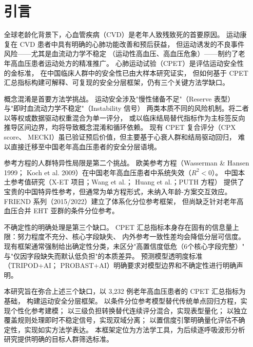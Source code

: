 \documentclass[12pt, a4paper]{ctexart}
\begin{document}
\section{引言}

全球老龄化背景下，心血管疾病（CVD）是老年人致残致死的首要原因\cite{WHO2023}。
运动康复在 CVD 患者中具有明确的心肺功能改善和预后获益\cite{Piepoli2016,Thomas2019}，
但运动诱发的不良事件风险——尤其是血流动力学不稳定
（运动性高血压、高血压危象）——制约了老年高血压患者运动处方的精准推广\cite{Myers2013}。
心肺运动试验（CPET）是评估运动安全性的金标准\cite{Balady2010,Guazzi2012}，
在中国临床人群中的安全性已由大样本研究证实\cite{Xiangya2021,SunXG2022consensus}，
但如何基于 CPET 汇总指标构建可解释、可复现的安全分层框架，仍有三个关键方法学缺口。

概念混淆是首要方法学挑战。
运动安全涉及"慢性储备不足"（Reserve 表型）与"即时血流动力学不稳定"（Instability 信号）
两类本质不同的风险机制。将二者以等权或数据驱动权重混合为单一评分，
或以临床结局替代指标作为主标签反向推导区间边界，均将导致概念混淆和循环依赖\cite{Ross2024}。
现有 CPET 复合评分（CPX score\cite{Gorodeski2008cpx,CPXvalidation2013}、
MECKI\cite{MECKI2023}）虽已验证预后价值，但主要基于心衰人群和结局驱动回归，
难以直接迁移至中国老年高血压患者的安全分层语境。

参考方程的人群特异性局限是第二个挑战。
欧美参考方程（Wasserman \& Hansen 1999\cite{Wasserman1999}；
Koch et al. 2009\cite{Koch2009}）在中国老年高血压患者中系统失效（$R^2<0$）。
中国本土参考值研究（X-ET 项目\cite{XET2021}；Wang et al.\cite{WangCycle2022}；
Huang et al.\cite{HuangTreadmill2024}；PUTH 方程\cite{PUTHCycle2025}）
提供了宝贵的中国特异性参考，但通常为单方程形式，未纳入年龄-方案交互效应。
FRIEND 系列（2015/2022\cite{FRIEND2016cycle,FRIEND2022}）建立了体系化分位参考框架，
但尚缺乏针对老年高血压合并 EHT 亚群的条件分位参考。

不确定性的明确处理是第三个缺口。
CPET 汇总指标本身存在固有的信息量上限：努力程度不充分、核心字段缺失、
内外参考一致性差均会降低分层可信度。
现有框架通常强制给出确定性分类，未区分"高置信度低危（6个核心字段完整）"
与"仅因字段缺失而默认低负担"的本质差异。
预测模型透明度标准（TRIPOD+AI\cite{TRIPODAI2024}；
PROBAST+AI\cite{PROBASTAI2025}）明确要求对模型边界和不确定性进行明确声明。

本研究旨在弥合上述三个缺口，以 3,232 例老年高血压患者的 CPET 汇总指标为基础，
构建运动安全分层框架。
以条件分位参考模型替代传统单点回归方程，实现个性化参考建模；
以三级负担转换替代连续评分混合，实现表型量化；
以独立覆盖规则处理即时不稳定信号，实现双域分离；
以置信度引擎明确量化评估不确定性，实现如实方法学表达。
本框架定位为方法学工具，为后续逐呼吸波形分析研究提供明确的目标人群筛选标准。
\end{document}
